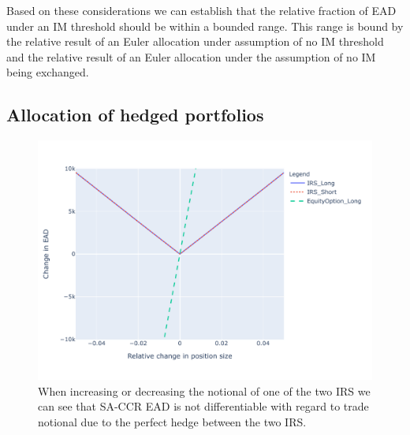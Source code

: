\documentclass[../Thesis_AHoecherl.tex]{subfiles}
\begin{document}
    Based on these considerations we can establish that the relative fraction of \gls{EAD} under an \gls{IM} threshold should be within a bounded range. 
    This range is bound by the relative result of an Euler allocation under assumption of no \gls{IM} threshold and the relative result of an Euler allocation under the assumption of no \gls{IM} being exchanged.
    
    \subsection{Allocation of hedged portfolios\label{sec:Allocation of hedged portfolios}}
    
    \begin{figure}
        \centering
        \includegraphics{Graphics/Indifferentiabililty_of_EAD.pdf}
        \caption[Non-differentiability of \gls{SA-CCR} \gls{EAD}]{When increasing or decreasing the notional of one of the two \gls{IRS} we can see that \gls{SA-CCR} \gls{EAD} is not differentiable with regard to trade notional due to the perfect hedge between the two \gls{IRS}.}
        \label{fig:indifferentiability of ead}
    \end{figure}
\end{document}

